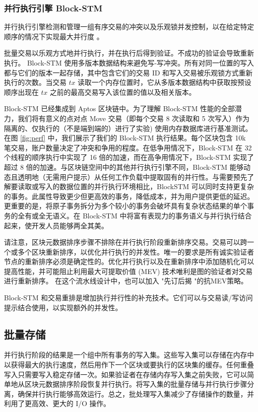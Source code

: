 \documentclass{article}
\begin{document}
\subsubsection{并行执行引擎 Block-STM} 

并行执行引擎检测和管理一组有序交易的冲突以及乐观锁并发控制，以在给定特定顺序的情况下实现最大并行度 \cite{block_stm}。

批量交易以乐观方式地并行执行，并在执行后得到验证。不成功的验证会导致重新执行。 Block-STM 使用多版本数据结构来避免写-写冲突。所有对同一位置的写入都与它们的版本一起存储，其中包含它们的交易 ID 和写入交易被乐观锁方式重新执行的次数。当交易 $tx$ 读取一个内存位置时，它从多版本数据结构中获取按预设顺序出现在 $tx$ 之前的最高交易写入该位置的值以及相关版本。

Block-STM 已经集成到 Aptos 区块链中。为了理解 Block-STM 性能的全部潜力，我们将有意义的点对点 Move 交易（即每个交易 8 次读取和 5 次写入）作为隔离的、仅执行的（不是端到端的）进行了实验) 使用内存数据库进行基准测试。在图 \ref{fig:perf} 中，我们展示了我们的 Block-STM 执行结果。每个区块包含 10k 笔交易，账户数量决定了冲突和争用的程度。在低争用情况下，Block-STM 在 32 个线程的顺序执行中实现了 16 倍的加速，而在高争用情况下，Block-STM 实现了超过 8 倍的加速。与区块链空间中的其他并行执行引擎不同，Block-STM 能够动态且透明地（无需用户提示）从任何工作负载中提取固有的并行性。与需要预先了解要读取或写入的数据位置的并行执行环境相比，BlockSTM 可以同时支持更复杂的事务。此属性导致更少但更高效的事务，降低成本，并为用户提供更低的延迟。更重要的是，将原子事务拆分为多个较小的事务会破坏具有复杂状态结果的单个事务的全有或全无语义。在 Block-STM 中将富有表现力的事务语义与并行执行结合起来，使开发人员能够两全其美。

请注意，区块元数据排序步骤不排除在并行执行阶段重新排序交易。交易可以跨一个或多个区块重新排序，以优化并行执行的并发性。唯一的要求是所有诚实验证者节点的重新排序必须是确定性的。优化并行执行以及在重新排序中添加随机化可以提高性能，并可能阻止利用最大可提取价值 (MEV) 技术唯利是图的验证者对交易进行重新排序。 在这个流水线设计中，也可以加入 "先订后揭 "的抗MEV策略。 

Block-STM 和交易重排是增加执行并行性的补充技术。它们可以与交易读/写访问提示结合使用，以实现额外的并发性。

\subsection{批量存储}

并行执行阶段的结果是一个组中所有事务的写入集。这些写入集可以存储在内存中以获得最大的执行速度，然后用作下一个区块或要执行的区块集的缓存。任何重叠写入只需要写入稳定存储一次。如果验证者在存储内存写入集之前失败，它可以简单地从区块元数据排序阶段恢复并行执行。将写入集的批量存储与并行执行步骤分离，确保并行执行能够高效运行。总之，批处理写入集减少了存储操作的数量，并利用了更高效、更大的 I/O 操作。
\end{document}
